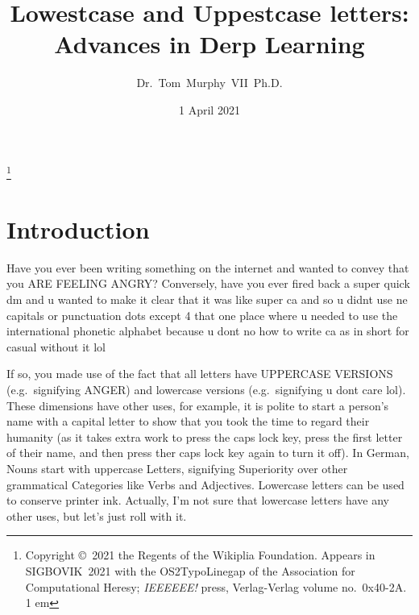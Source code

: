 \documentclass[twocolumn]{article}
\begin{document}
\title{Lowestcase and Uppestcase letters: Advances in Derp Learning}
\author{Dr.~Tom~Murphy~VII~Ph.D.}\thanks{
Copyright \copyright\ 2021 the Regents of the Wikiplia Foundation.
Appears in SIGBOVIK~2021 with the
OS2TypoLinegap of the Association for Computational Heresy; {\em IEEEEEE!}
press, Verlag-Verlag volume no.~0x40-2A. 1 em}


\newcommand\makelowercase{{\sf make\_lowercase}}
\newcommand\makeuppercase{{\sf make\_uppercase}}

\renewcommand\th{\ensuremath{{}^{\textrm{th}}}}
\newcommand\st{\ensuremath{{}^{\textrm{st}}}}
\newcommand\rd{\ensuremath{{}^{\textrm{rd}}}}
\newcommand\nd{\ensuremath{{}^{\textrm{nd}}}}
\newcommand\at{\ensuremath{\scriptstyle @}}

\renewcommand\paragraph[1]{\smallskip \noindent{\bf #1}\enspace}

\date{1 April 2021}

\maketitle \thispagestyle{empty}

\sloppypar


\section{Introduction}

Have you ever been writing something on the internet and wanted to convey
that you ARE FEELING ANGRY? Conversely, have you ever fired back a super
quick dm and u wanted to make it clear that it was like super ca
and so u didnt use ne capitals or punctuation dots except 4 that one place
where u needed to use the international phonetic alphabet because u dont
no how to write ca as in short for casual without it lol

If so, you made use of the fact that all letters have UPPERCASE
VERSIONS (e.g.~signifying ANGER) and lowercase versions
(e.g.~signifying u dont care lol). These dimensions have other uses,
for example, it is polite to start a person's name with a capital
letter to show that you took the time to regard their humanity (as it
takes extra work to press the caps lock key, press the first letter of
their name, and then press ther caps lock key again to turn it off).
In German, Nouns start with uppercase Letters, signifying Superiority
over other grammatical Categories like Verbs and Adjectives. Lowercase
letters can be used to conserve printer ink. Actually, I'm not sure that
lowercase letters have any other uses, but let's just roll with it.
\end{document}
